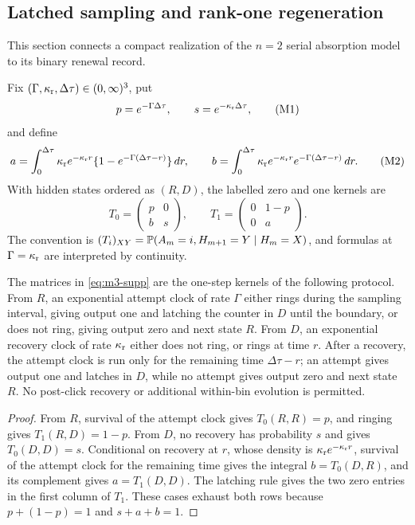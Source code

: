 \subsection{Latched sampling and rank-one regeneration}
\label{sec:two-state-model-supp}

This section connects a compact realization of the \(n=2\) serial absorption
model to its binary renewal record.

\begin{assumption}
\label{ass:two-state-counter-supp}
Fix \((\Gamma,\kappa_{\rm r},\Delta\tau)\in(0,\infty)^3\), put
\[
 p=e^{-\Gamma\Delta\tau},\qquad
 s=e^{-\kappa_{\rm r}\Delta\tau},
\tag{M1}\label{eq:m1-supp}
\]
and define
\[
 a=\int_0^{\Delta\tau}\kappa_{\rm r}e^{-\kappa_{\rm r}r}
 \{1-e^{-\Gamma(\Delta\tau-r)}\}\,dr,
\qquad
 b=\int_0^{\Delta\tau}\kappa_{\rm r}e^{-\kappa_{\rm r}r}
 e^{-\Gamma(\Delta\tau-r)}\,dr.
\tag{M2}\label{eq:m2-supp}
\]
With hidden states ordered as \((R,D)\), the labelled zero and one kernels are
\[
 T_0=\begin{pmatrix}p&0\\b&s\end{pmatrix},\qquad
 T_1=\begin{pmatrix}0&1-p\\0&a\end{pmatrix}.
\tag{M3}\label{eq:m3-supp}
\]
The convention is
\((T_i)_{XY}=\mathbb P(A_m=i,H_{m+1}=Y\mid H_m=X)\), and formulas at
\(\Gamma=\kappa_{\rm r}\) are interpreted by continuity.
\end{assumption}

\begin{lemma}
\label{lem:two-state-kernel-derivation-supp}
The matrices in \eqref{eq:m3-supp} are the one-step kernels of the following
protocol.  From \(R\), an exponential attempt clock of rate \(\Gamma\) either
rings during the sampling interval, giving output one and latching the counter
in \(D\) until the boundary, or does not ring, giving output zero and next
state \(R\).  From \(D\), an exponential recovery clock of rate
\(\kappa_{\rm r}\) either does not ring, or rings at time \(r\).  After a
recovery, the attempt clock is run only for the remaining time
\(\Delta\tau-r\); an attempt gives output one and latches in \(D\), while no
attempt gives output zero and next state \(R\).  No post-click recovery or
additional within-bin evolution is permitted.
\end{lemma}

\begin{proof}
From \(R\), survival of the attempt clock gives \(T_0(R,R)=p\), and ringing
gives \(T_1(R,D)=1-p\).  From \(D\), no recovery has probability \(s\) and
gives \(T_0(D,D)=s\).  Conditional on recovery at \(r\), whose density is
\(\kappa_{\rm r}e^{-\kappa_{\rm r}r}\), survival of the attempt clock for the
remaining time gives the integral \(b=T_0(D,R)\), and its complement gives
\(a=T_1(D,D)\).  The latching rule gives the two zero entries in the first
column of \(T_1\).  These cases exhaust both rows because \(p+(1-p)=1\) and
\(s+a+b=1\).
\end{proof}

